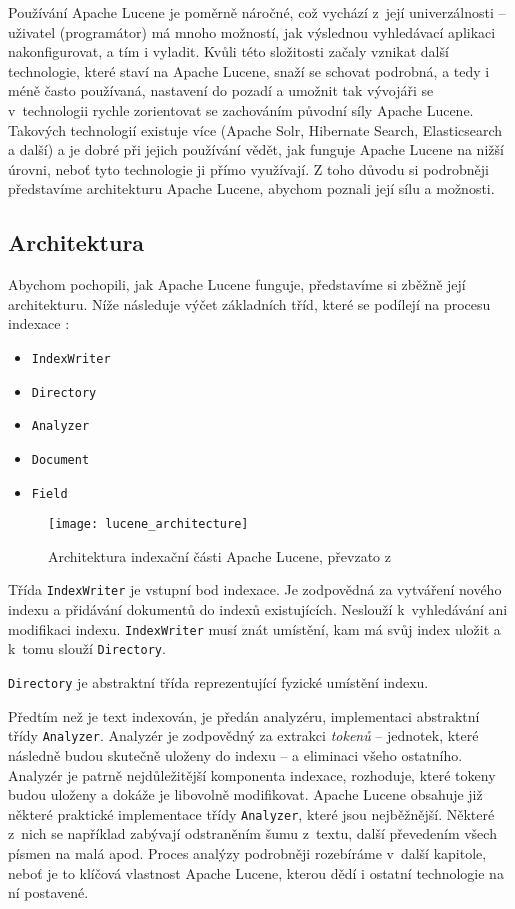 \documentclass[11pt,oneside]{fithesis2}
\begin{document}
Používání Apache Lucene je poměrně náročné, což vychází z~její univerzálnosti \cite{ElasticsearchDefinitiveGuide}  -- uživatel (programátor) má mnoho možností, jak výslednou vyhledávací aplikaci nakonfigurovat, a tím i vyladit. Kvůli této složitosti začaly vznikat další technologie, které staví na Apache Lucene, snaží se schovat podrobná, a tedy i méně často používaná, nastavení do pozadí a umožnit tak vývojáři se v~technologii rychle zorientovat se zachováním původní síly Apache Lucene. Takových technologií existuje více (Apache Solr, Hibernate Search, Elasticsearch a další) a je dobré při jejich používání vědět, jak funguje Apache Lucene na nižší úrovni, neboť tyto technologie ji přímo využívají. Z toho důvodu si podrobněji představíme architekturu Apache Lucene, abychom poznali její sílu a možnosti.

\subsection{Architektura}
Abychom pochopili, jak Apache Lucene funguje, představíme si zběžně její architekturu. Níže následuje výčet základních tříd, které se podílejí na procesu indexace \cite[s.~26]{LuceneAction}:
\begin{itemize}
	\item \texttt{IndexWriter}
	\item \texttt{Directory}
	\item \texttt{Analyzer}
	\item \texttt{Document}
	\item \texttt{Field}
\end{itemize}

\begin{figure}[htp]
	\begin{center}
		\texttt{[image: lucene\_architecture]}
	\end{center}
	\caption{Architektura indexační části Apache Lucene, převzato z~\cite[s.~26]{LuceneAction}}	
\end{figure}

Třída \texttt{IndexWriter} je vstupní bod indexace. Je zodpovědná za vytváření nového indexu a přidávání dokumentů do indexů existujících. Neslouží k~vyhledávání ani modifikaci indexu. \texttt{IndexWriter} musí znát umístění, kam má svůj index uložit a k~tomu slouží \texttt{Directory}. 

\texttt{Directory} je abstraktní třída reprezentující fyzické umístění indexu.  

Předtím než je text indexován, je předán analyzéru, implementaci abstraktní třídy \texttt{Analyzer}. Analyzér je zodpovědný za extrakci \emph{tokenů} -- jednotek, které následně budou skutečně uloženy do indexu \cite[s.~116]{LuceneAction} -- a eliminaci všeho ostatního. Analyzér je patrně nejdůležitější komponenta indexace, rozhoduje, které tokeny budou uloženy a dokáže je libovolně modifikovat. Apache Lucene obsahuje již některé praktické implementace třídy \texttt{Analyzer}, které jsou nejběžnější. Některé z~nich  se například zabývají odstraněním šumu z~textu, další převedením všech písmen na malá apod. Proces analýzy podrobněji rozebíráme v~další kapitole, neboť je to klíčová vlastnost Apache Lucene, kterou dědí i ostatní technologie na ní postavené.
\end{document}
